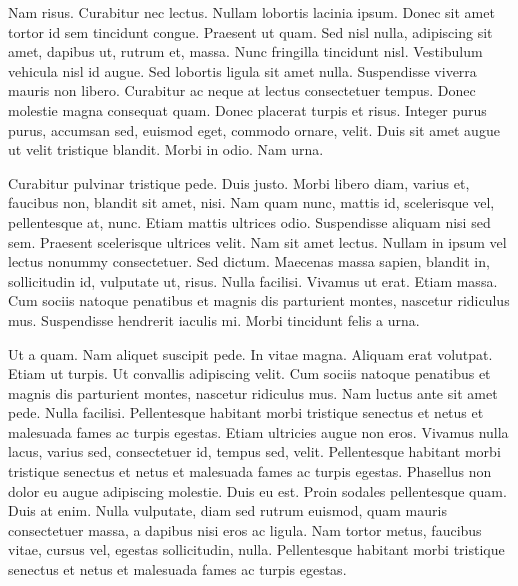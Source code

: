 Nam risus. Curabitur nec lectus. Nullam lobortis lacinia ipsum. Donec sit amet tortor id sem tincidunt congue. Praesent ut quam. Sed nisl nulla, adipiscing sit amet, dapibus ut, rutrum et, massa. Nunc fringilla tincidunt nisl. Vestibulum vehicula nisl id augue. Sed lobortis ligula sit amet nulla. Suspendisse viverra mauris non libero. Curabitur ac neque at lectus consectetuer tempus. Donec molestie magna consequat quam. Donec placerat turpis et risus. Integer purus purus, accumsan sed, euismod eget, commodo ornare, velit. Duis sit amet augue ut velit tristique blandit. Morbi in odio. Nam urna.

Curabitur pulvinar tristique pede. Duis justo. Morbi libero diam, varius et, faucibus non, blandit sit amet, nisi. Nam quam nunc, mattis id, scelerisque vel, pellentesque at, nunc. Etiam mattis ultrices odio. Suspendisse aliquam nisi sed sem. Praesent scelerisque ultrices velit. Nam sit amet lectus. Nullam in ipsum vel lectus nonummy consectetuer. Sed dictum. Maecenas massa sapien, blandit in, sollicitudin id, vulputate ut, risus. Nulla facilisi. Vivamus ut erat. Etiam massa. Cum sociis natoque penatibus et magnis dis parturient montes, nascetur ridiculus mus. Suspendisse hendrerit iaculis mi. Morbi tincidunt felis a urna.

Ut a quam. Nam aliquet suscipit pede. In vitae magna. Aliquam erat volutpat. Etiam ut turpis. Ut convallis adipiscing velit. Cum sociis natoque penatibus et magnis dis parturient montes, nascetur ridiculus mus. Nam luctus ante sit amet pede. Nulla facilisi. Pellentesque habitant morbi tristique senectus et netus et malesuada fames ac turpis egestas. Etiam ultricies augue non eros. Vivamus nulla lacus, varius sed, consectetuer id, tempus sed, velit. Pellentesque habitant morbi tristique senectus et netus et malesuada fames ac turpis egestas. Phasellus non dolor eu augue adipiscing molestie. Duis eu est. Proin sodales pellentesque quam. Duis at enim. Nulla vulputate, diam sed rutrum euismod, quam mauris consectetuer massa, a dapibus nisi eros ac ligula. Nam tortor metus, faucibus vitae, cursus vel, egestas sollicitudin, nulla. Pellentesque habitant morbi tristique senectus et netus et malesuada fames ac turpis egestas.
